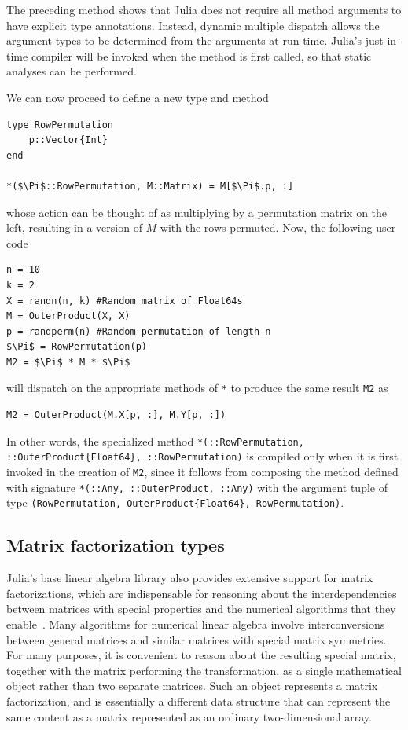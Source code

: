 \documentclass[10pt, preprint]{sigplanconf}
\begin{document}
The preceding method shows that Julia does not require all method arguments to
have explicit type annotations. Instead, dynamic multiple dispatch allows the
argument types to be determined from the arguments at run time.
Julia's just-in-time compiler will be invoked when the method is first
called, so that static analyses can be performed.

We can now proceed to define a new type and method

\begin{lstlisting}
type RowPermutation
	p::Vector{Int}
end

*($\Pi$::RowPermutation, M::Matrix) = M[$\Pi$.p, :]
\end{lstlisting}
%
whose action can be thought of as multiplying by a permutation matrix on the
left, resulting in a version of $M$ with the rows permuted. Now, the following
user code
%
\begin{lstlisting}
n = 10
k = 2
X = randn(n, k) #Random matrix of Float64s
M = OuterProduct(X, X)
p = randperm(n) #Random permutation of length n
$\Pi$ = RowPermutation(p)
M2 = $\Pi$ * M * $\Pi$
\end{lstlisting}
%
will dispatch on the appropriate methods of \lstinline|*| to produce the same
result \lstinline|M2| as
\begin{lstlisting}
M2 = OuterProduct(M.X[p, :], M.Y[p, :])
\end{lstlisting}
%
In other words, the specialized method
\lstinline|*(::RowPermutation, ::OuterProduct{Float64}, ::RowPermutation)|
is compiled only when it is first invoked in the creation of
\lstinline|M2|, since it follows from composing the method defined with
signature \lstinline|*(::Any, ::OuterProduct, ::Any)| with the argument tuple
of type \lstinline|(RowPermutation, OuterProduct{Float64}, RowPermutation)|.

\subsection{Matrix factorization types}

Julia's base linear algebra library also provides extensive support for matrix
factorizations, which are indispensable for reasoning about the
interdependencies between matrices with special properties and the numerical
algorithms that they enable~\cite{Golub1996}. Many algorithms for numerical
linear algebra involve interconversions between general matrices and similar
matrices with special matrix symmetries. For many purposes, it is convenient to
reason about the resulting special matrix, together with the matrix performing
the transformation, as a single mathematical object rather than two separate
matrices. Such an object represents a matrix factorization, and is essentially
a different data structure that can represent the same content as a matrix
represented as an ordinary two-dimensional array.
\end{document}
